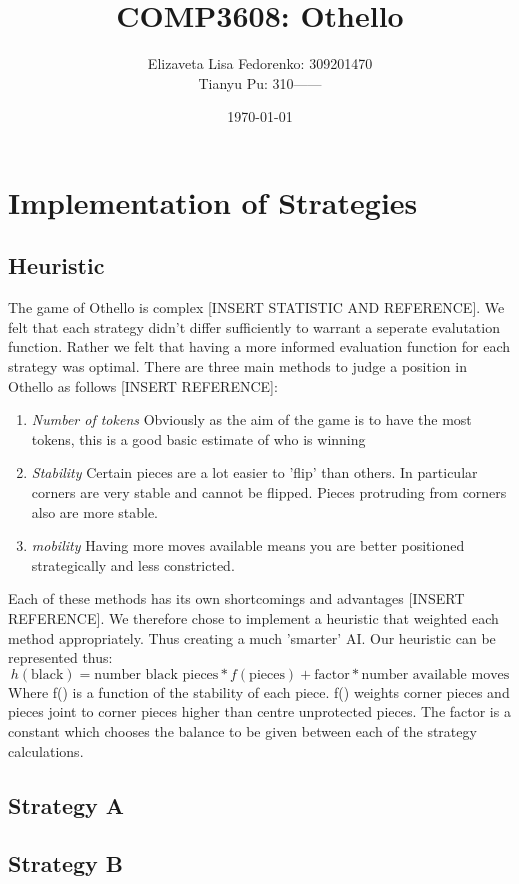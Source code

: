 \documentclass[12pt]{article}
\title{COMP3608: Othello}
\author{Elizaveta Lisa Fedorenko: 309201470
\\ Tianyu Pu: 310------}
\date{\today}
\begin{document}
\maketitle

\section{Implementation of Strategies}
\subsection{Heuristic}
The game of Othello is complex [INSERT STATISTIC AND REFERENCE]. We felt that each strategy didn't differ sufficiently to warrant a seperate evalutation function. Rather we felt that having a more informed evaluation function for each strategy was optimal. There are three main methods to judge a position in Othello as follows [INSERT REFERENCE]:
\begin{enumerate}
\item \emph{Number of tokens} Obviously as the aim of the game is to have the most tokens, this is a good basic estimate of who is winning
\item \emph{Stability} Certain pieces are a lot easier to 'flip' than others. In particular corners are very stable and cannot be flipped. Pieces protruding from corners also are more stable.
\item \emph{mobility} Having more moves available means you are better positioned strategically and less constricted.
\end{enumerate}
Each of these methods has its own shortcomings and advantages [INSERT REFERENCE]. We therefore chose to implement a heuristic that weighted each method appropriately. Thus creating a much 'smarter' AI.
Our heuristic can be represented thus:
\begin{equation}
h(\mbox{black}) = \mbox{number black pieces}*f(\mbox{pieces}) + \mbox{factor}*\mbox{number available moves}
\end{equation}
Where f() is a function of the stability of each piece. f() weights corner pieces and pieces joint to corner pieces higher than centre unprotected pieces. The factor is a constant which chooses the balance to be given between each of the strategy calculations.
\subsection{Strategy A}
\subsection{Strategy B}
\end{document}
